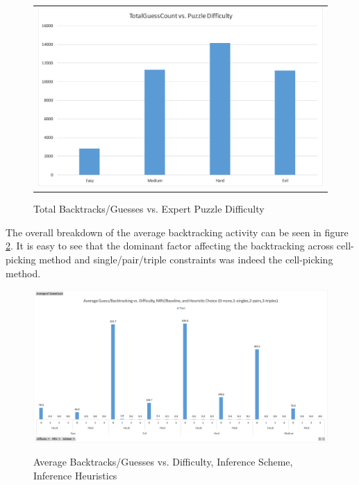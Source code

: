 \documentclass{article}
\begin{document}
\begin{figure}[H]%
	\centering\begin{tabular}{c}
		\includegraphics[scale=0.4]{plots/total-guess-count-vs-puzzle-diff.png}\\
	\end{tabular}
	\caption{Total Backtracks/Guesses vs. Expert Puzzle Difficulty}%
	\label{fig:total_backtrack_vs_diff}%
\end{figure}

The overall breakdown of the average backtracking activity can be seen in figure \ref{fig:avg_backtracks_vs_factors}. It is easy to see that the dominant factor affecting the backtracking across cell-picking method and single/pair/triple constraints was indeed the cell-picking method.\\

\begin{figure}
	\centering
	\includegraphics[scale=0.66]{plots/average-backtrack-guesses-vs-diff-scheme-heuristic.png}\\
	\caption{Average Backtracks/Guesses vs. Difficulty, Inference Scheme, Inference Heuristics}%
	\label{fig:avg_backtracks_vs_factors}%
\end{figure}
\end{document}
